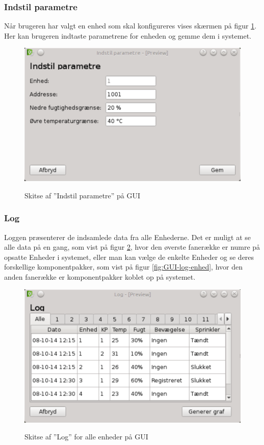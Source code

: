 \subsubsection{Indstil parametre}
Når brugeren har valgt en enhed som skal konfigureres vises skærmen på figur \ref{fig:GUI-indstil-parametre}. Her kan brugeren indtaste parametrene for enheden og gemme dem i systemet.

\begin{figure}[htbp] \centering
{\includegraphics[scale=0.5]{filer/pics/GUI/Indstil-parametre}}
\caption{Skitse af ''Indstil parametre'' på GUI}
\label{fig:GUI-indstil-parametre}
\end{figure}

\subsubsection{Log}
Loggen præsenterer de indsamlede data fra alle Enhederne. Det er muligt at se alle data på en gang, som vist på figur \ref{fig:GUI-log-alle}, hvor den øverste fanerække er numre på opsatte Enheder i systemet, eller man kan vælge de enkelte Enheder og se deres forskellige komponentpakker, som vist på figur \ref{fig:GUI-log-enhed}, hvor den anden fanerække er komponentpakker koblet op på systemet.

\begin{figure}[htbp] \centering
{\includegraphics[scale=0.5]{filer/pics/GUI/Log-alle}}
\caption{Skitse af ''Log'' for alle enheder på GUI}
\label{fig:GUI-log-alle}
\end{figure}

